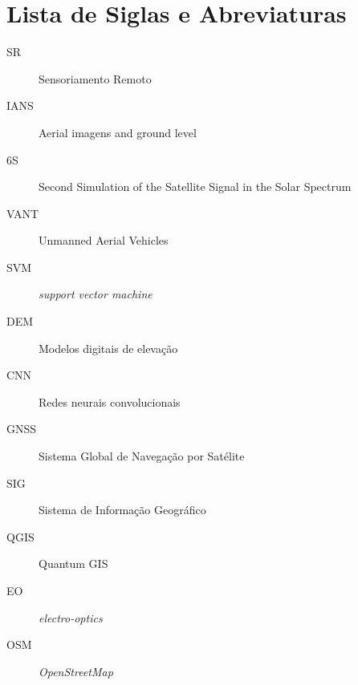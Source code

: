 \section*{Lista de Siglas e Abreviaturas}

\begin{description}
    \item[SR] Sensoriamento Remoto
    
    \item[IANS] Aerial imagens and ground level
    
    \item[6S] Second Simulation of the Satellite Signal in the Solar Spectrum
    
    \item[VANT] Unmanned Aerial Vehicles
    
    \item [SVM] \textit{support vector machine}
    
    \item [DEM] Modelos digitais de elevação
    
    \item [CNN] Redes neurais convolucionais
    
    \item  [GNSS] Sistema Global de Navegação por Satélite
    
    \item [SIG] Sistema de Informação Geográfico
    \item [QGIS] Quantum GIS
    
    \item [EO] \textit{electro-optics}
    
    \item[OSM] \textit{OpenStreetMap}
    
\end{description}
    